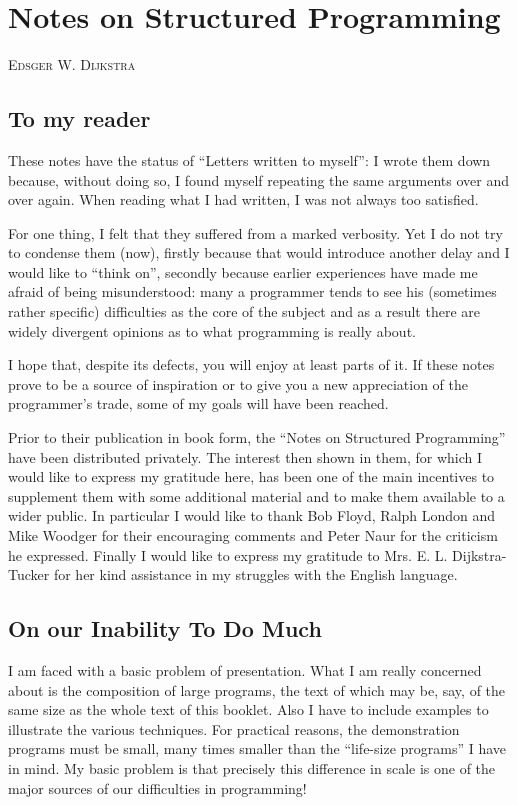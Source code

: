 \chapter{Notes on Structured Programming}

{
	\noindent
	\scshape\hfill\small Edsger W. Dijkstra\hfill
}

\section{To my reader}

These notes have the status of ``Letters written to myself'': I wrote them down because, without doing so, I found myself repeating the same arguments over and over again. When reading what I had written, I was not always too satisfied.

For one thing, I felt that they suffered from a marked verbosity. Yet I do not try to condense them (now), firstly because that would introduce another delay and I would like to ``think on'', secondly because earlier experiences have made me afraid of being misunderstood: many a programmer tends to see his (sometimes rather specific) difficulties as the core of the subject and as a result there are widely divergent opinions as to what programming is really about.

I hope that, despite its defects, you will enjoy at least parts of it. If these notes prove to be a source of inspiration or to give you a new appreciation of the programmer's trade, some of my goals will have been reached.

Prior to their publication in book form, the ``Notes on Structured Programming'' have been distributed privately. The interest then shown in
them, for which I would like to express my gratitude here, has been one of the main incentives to supplement them with some additional material and to make them available to a wider public. In particular I would like to thank Bob Floyd, Ralph London and Mike Woodger for their encouraging
comments and Peter Naur for the criticism he expressed. Finally I would like to express my gratitude to Mrs. E. L. Dijkstra-Tucker for her kind
assistance in my struggles with the English language.

\section{On our Inability To Do Much}

I am faced with a basic problem of presentation. What I am really concerned about is the composition of large programs, the text of which may be, say, of the same size as the whole text of this booklet. Also I have to include examples to illustrate the various techniques. For practical reasons, the demonstration programs must be small, many times smaller than the ``life-size programs'' I have in mind. My basic problem is that precisely this difference in scale is one of the major sources of our difficulties in programming!

